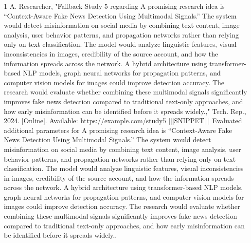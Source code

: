\documentclass[conference]{IEEEtran}
\begin{document}
\begin{thebibliography}{1}
A. Researcher, "Fallback Study 5 regarding A promising research idea is “Context-Aware Fake News Detection Using Multimodal Signals.” The system would detect misinformation on social media by combining text content, image analysis, user behavior patterns, and propagation networks rather than relying only on text classification. The model would analyze linguistic features, visual inconsistencies in images, credibility of the source account, and how the information spreads across the network. A hybrid architecture using transformer-based NLP models, graph neural networks for propagation patterns, and computer vision models for images could improve detection accuracy. The research would evaluate whether combining these multimodal signals significantly improves fake news detection compared to traditional text-only approaches, and how early misinformation can be identified before it spreads widely.," Tech. Rep., 2024. [Online]. Available: https://example.com/study5 |||SNIPPET||| Evaluated additional parameters for A promising research idea is “Context-Aware Fake News Detection Using Multimodal Signals.” The system would detect misinformation on social media by combining text content, image analysis, user behavior patterns, and propagation networks rather than relying only on text classification. The model would analyze linguistic features, visual inconsistencies in images, credibility of the source account, and how the information spreads across the network. A hybrid architecture using transformer-based NLP models, graph neural networks for propagation patterns, and computer vision models for images could improve detection accuracy. The research would evaluate whether combining these multimodal signals significantly improves fake news detection compared to traditional text-only approaches, and how early misinformation can be identified before it spreads widely..

\end{thebibliography}
\end{document}
